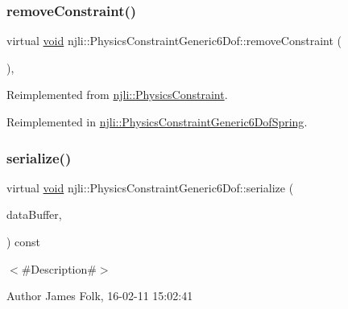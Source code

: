 \subsubsection{\texorpdfstring{remove\+Constraint()}{removeConstraint()}}
{\footnotesize\ttfamily virtual \mbox{\hyperlink{_thread_8h_af1e856da2e658414cb2456cb6f7ebc66}{void}} njli\+::\+Physics\+Constraint\+Generic6\+Dof\+::remove\+Constraint (\begin{DoxyParamCaption}{ }\end{DoxyParamCaption})\hspace{0.3cm}{\ttfamily [protected]}, {\ttfamily [virtual]}}



Reimplemented from \mbox{\hyperlink{classnjli_1_1_physics_constraint_ae3dc487da3069d859bb4ddb05aa2e779}{njli\+::\+Physics\+Constraint}}.



Reimplemented in \mbox{\hyperlink{classnjli_1_1_physics_constraint_generic6_dof_spring_ad8d9013c4e17710207f13cf40d667cd1}{njli\+::\+Physics\+Constraint\+Generic6\+Dof\+Spring}}.

\mbox{\label{classnjli_1_1_physics_constraint_generic6_dof_adebf86567407706023e5800b59308635}} 
\subsubsection{\texorpdfstring{serialize()}{serialize()}}
{\footnotesize\ttfamily virtual \mbox{\hyperlink{_thread_8h_af1e856da2e658414cb2456cb6f7ebc66}{void}} njli\+::\+Physics\+Constraint\+Generic6\+Dof\+::serialize (\begin{DoxyParamCaption}\item[{\mbox{\hyperlink{_thread_8h_af1e856da2e658414cb2456cb6f7ebc66}{void}} $\ast$}]{data\+Buffer,  }\item[{bt\+Serializer $\ast$}]{ }\end{DoxyParamCaption}) const\hspace{0.3cm}{\ttfamily [virtual]}}



$<$\#\+Description\#$>$ 

\begin{DoxyAuthor}{Author}
James Folk, 16-\/02-\/11 15\+:02\+:41
\end{DoxyAuthor}

